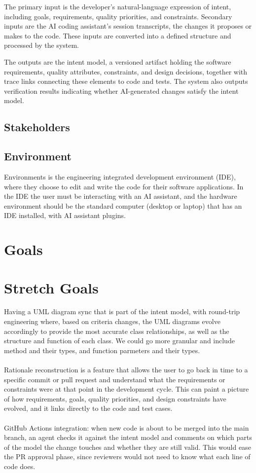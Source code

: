 \documentclass{article}
\begin{document}
The primary input is the developer's natural-language expression of intent, including goals, requirements,  quality priorities, and constraints. 
Secondary inputs are the AI coding assistant's session transcripts,  the changes it proposes or makes to the code.  These inputs are converted into a defined structure and processed by the system.

The outputs are the intent model, a versioned artifact holding the software requirements, quality attributes,  constraints, and design decisions, together with trace links connecting these elements to code and tests.  
The system also outputs verification results indicating whether AI-generated changes satisfy the intent model.

\subsection{Stakeholders}

\subsection{Environment}

Environments is the engineering integrated development environment (IDE), where they choose to edit and write the code for their software applications.
In the IDE the user must be interacting with an AI assistant, and the hardware environment should be the standard computer (desktop or laptop) that has an
IDE installed, with AI assistant plugins.

\section{Goals}

\section{Stretch Goals}

Having a UML diagram sync that is part of the intent model, with round-trip engineering where, based on criteria changes, 
the UML diagrams evolve accordingly to provide the most accurate class relationships, as well as the structure and function of each class.
We could go more granular and include method and their types, and function parmeters and their types. 
\\\\
Rationale reconstruction is a feature that allows the user to go back in time to a specific commit or pull request and understand what the requirements 
or constraints were at that point in the development cycle. This can paint a picture of how requirements, goals, quality priorities, and design constraints have evolved, and it links 
directly to the code and test cases.
\\\\
GitHub Actions integration: when new code is about to be merged into the main branch, an agent checks it against the intent model and comments on 
which parts of the model the change touches and whether they are still valid. This would ease the PR approval phase, since reviewers would not need to know what each line of code does.
\end{document}
